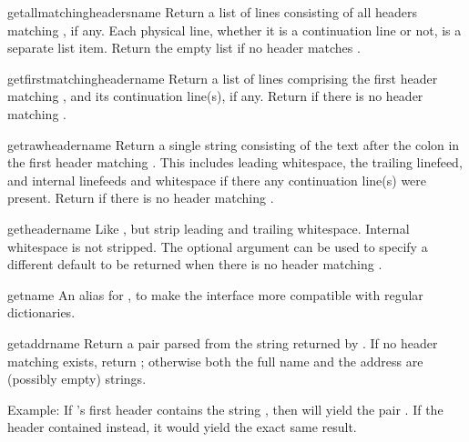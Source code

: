 \begin{methoddesc}{getallmatchingheaders}{name}
Return a list of lines consisting of all headers matching
, if any.  Each physical line, whether it is a continuation
line or not, is a separate list item.  Return the empty list if no
header matches .
\end{methoddesc}

\begin{methoddesc}{getfirstmatchingheader}{name}
Return a list of lines comprising the first header matching
, and its continuation line(s), if any.  Return
 if there is no header matching .
\end{methoddesc}

\begin{methoddesc}{getrawheader}{name}
Return a single string consisting of the text after the colon in the
first header matching .  This includes leading whitespace,
the trailing linefeed, and internal linefeeds and whitespace if there
any continuation line(s) were present.  Return  if there is
no header matching .
\end{methoddesc}

\begin{methoddesc}{getheader}{name}
Like , but strip leading and trailing
whitespace.  Internal whitespace is not stripped.  The optional
 argument can be used to specify a different default to
be returned when there is no header matching .
\end{methoddesc}

\begin{methoddesc}{get}{name}
An alias for , to make the interface more compatible 
with regular dictionaries.
\end{methoddesc}

\begin{methoddesc}{getaddr}{name}
Return a pair  parsed
from the string returned by .  If no
header matching  exists, return ;
otherwise both the full name and the address are (possibly empty)
strings.

Example: If 's first  header contains the
string , then
 will yield the pair
.
If the header contained
 instead, it would yield the
exact same result.
\end{methoddesc}

